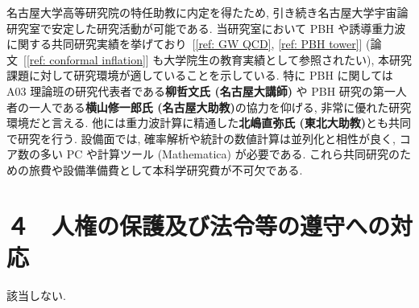 \documentclass[11pt,a4paper,uplatex,dvipdfmx]{ujarticle} 		%
\newcommand{\研究課題名}{曲率ゆらぎの統計と原始ブラックホール量の精密対応}
\newcommand{\研究機関名}{名古屋大学}
\newcommand{\研究代表者氏名}{多田祐一郎}
\newcommand{\研究期間の最終元号年度}{4}  %
\renewcommand{\emph}[1]{{\sffamily\gtfamily\bfseries #1}}
\begin{document}
\noindent
名古屋大学高等研究院の特任助教に内定を得たため, 引き続き名古屋大学宇宙論研究室で安定した研究活動が可能である.
当研究室において PBH や誘導重力波に関する共同研究実績を挙げており~[\ref{ref: GW QCD}, \ref{ref: PBH tower}] (論文~[\ref{ref: conformal inflation}] も大学院生の教育実績として参照されたい),
本研究課題に対して研究環境が適していることを示している.
特に PBH に関しては A03 理論班の研究代表者である\emph{柳哲文氏 (名古屋大講師)} や PBH 研究の第一人者の一人である\emph{横山修一郎氏 (名古屋大助教)}の協力を仰げる, 
非常に優れた研究環境だと言える.
他には重力波計算に精通した\emph{北嶋直弥氏 (東北大助教)}とも共同で研究を行う.
設備面では, 確率解析や統計の数値計算は並列化と相性が良く, コア数の多い PC や計算ツール (Mathematica) が必要である.
これら共同研究のための旅費や設備準備費として本科学研究費が不可欠である.


	
	




\section{４　人権の保護及び法令等の遵守への対応}


\noindent
該当しない.
	



\end{document}
